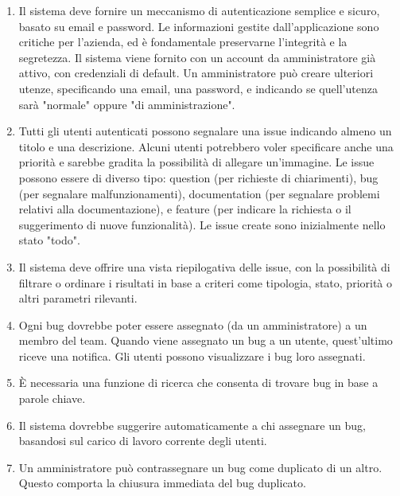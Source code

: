 \begin{enumerate}
  \item Il sistema deve fornire un meccanismo di autenticazione semplice e sicuro, basato su email e
        password. Le informazioni gestite dall’applicazione sono critiche per l’azienda, ed è fondamentale preservarne l’integrità e la segretezza. Il sistema viene fornito con un account da amministratore già attivo, con credenziali di default. Un amministratore può creare ulteriori utenze, specificando una email, una password, e indicando se quell’utenza sarà "normale" oppure "di amministrazione".
  \item Tutti gli utenti autenticati possono segnalare una issue indicando almeno un titolo e una
        descrizione. Alcuni utenti potrebbero voler specificare anche una priorità e sarebbe gradita la possibilità di allegare un’immagine. Le issue possono essere di diverso tipo: question (per richieste di chiarimenti), bug (per segnalare malfunzionamenti), documentation (per segnalare problemi relativi alla documentazione), e feature (per indicare la richiesta o il suggerimento di nuove funzionalità). Le issue create sono inizialmente nello stato "todo".
  \item Il sistema deve offrire una vista riepilogativa delle issue, con la possibilità di filtrare        o ordinare i risultati in base a criteri come tipologia, stato, priorità o altri parametri         rilevanti.
  \item Ogni bug dovrebbe poter essere assegnato (da un amministratore) a un membro del team. Quando
        viene assegnato un bug a un utente, quest’ultimo riceve una notifica. Gli utenti possono
        visualizzare i bug loro assegnati.
  \item È necessaria una funzione di ricerca che consenta di trovare bug in base a parole chiave.
  \item Il sistema dovrebbe suggerire automaticamente a chi assegnare un bug, basandosi sul carico di
        lavoro corrente degli utenti.
  \item Un amministratore può contrassegnare un bug come duplicato di un altro. Questo comporta la chiusura immediata del bug duplicato.

\end{enumerate}

